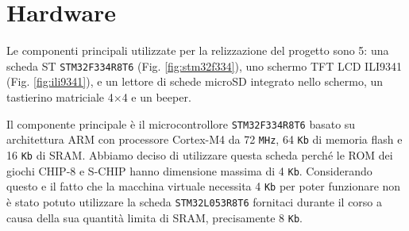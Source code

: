 \documentclass[a4paper]{article}
\begin{document}
\section{Hardware}\label{sec:hardware}

Le componenti principali utilizzate per la relizzazione del progetto sono 5:
una scheda ST \texttt{STM32F334R8T6} (Fig. \ref{fig:stm32f334}), uno schermo
TFT LCD ILI9341 (Fig. \ref{fig:ili9341}), e un lettore di schede microSD
integrato nello schermo, un tastierino matriciale 4$\times$4 e un beeper.

Il componente principale è il microcontrollore \texttt{STM32F334R8T6} basato su
architettura ARM con processore Cortex-M4 da 72 \texttt{MHz}, 64 \texttt{Kb} di
memoria flash e 16 \texttt{Kb} di SRAM. Abbiamo deciso di utilizzare questa
scheda perché le ROM dei giochi CHIP-8 e S-CHIP hanno dimensione massima di 4
\texttt{Kb}. Considerando questo e il fatto che la macchina virtuale necessita
4 \texttt{Kb} per poter funzionare non è stato potuto utilizzare la scheda
\texttt{STM32L053R8T6} fornitaci durante il corso a causa della sua quantità
limita di SRAM, precisamente 8 \texttt{Kb}.
\end{document}
